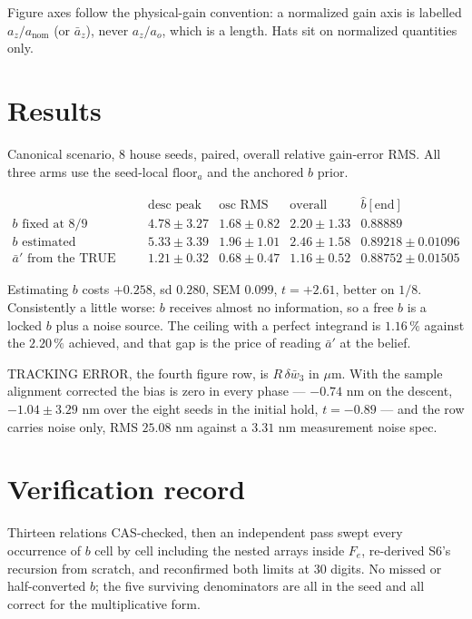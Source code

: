 \documentclass[11pt,a4paper,fontset=none]{ctexart}
\newcommand{\ba}{\bar{a}}
\newcommand{\bw}{\bar{w}}
\begin{document}
Figure axes follow the physical-gain convention: a normalized gain axis is
labelled $a_z/a_{\mathrm{nom}}$ (or $\ba_z$), never $a_z/a_o$, which is a
length. Hats sit on normalized quantities only.

\section*{Results}

Canonical scenario, 8 house seeds, paired, overall relative gain-error RMS. All
three arms use the seed-local $\mathrm{floor}_a$ and the anchored $b$ prior.

\begin{equation*}
\begin{array}{lcccc}
 & \text{desc peak} & \text{osc RMS} & \text{overall} & \hat{b}[\mathrm{end}] \\[0.2em]
b \text{ fixed at } 8/9 & 4.78\pm3.27 & 1.68\pm0.82 & 2.20\pm1.33 & 0.88889 \\
b \text{ estimated}     & 5.33\pm3.39 & 1.96\pm1.01 & 2.46\pm1.58 & 0.89218\pm0.01096 \\
\ba' \text{ from the TRUE height} & 1.21\pm0.32 & 0.68\pm0.47 & 1.16\pm0.52 & 0.88752\pm0.01505
\end{array}
\end{equation*}

Estimating $b$ costs $+0.258$, sd $0.280$, SEM $0.099$, $t = +2.61$, better on
$1/8$. Consistently a little worse: $b$ receives almost no information, so a
free $b$ is a locked $b$ plus a noise source. The ceiling with a perfect
integrand is $1.16\,\%$ against the $2.20\,\%$ achieved, and that gap is the
price of reading $\ba'$ at the belief.

TRACKING ERROR, the fourth figure row, is $R\,\delta\bw_3$ in $\mu$m. With the
sample alignment corrected the bias is zero in every phase --- $-0.74$ nm on the
descent, $-1.04 \pm 3.29$ nm over the eight seeds in the initial hold, $t=-0.89$
--- and the row carries noise only, RMS $25.08$ nm against a $3.31$ nm
measurement noise spec.

\section*{Verification record}

Thirteen relations CAS-checked, then an independent pass swept every occurrence
of $b$ cell by cell including the nested arrays inside $F_e$, re-derived S6's
recursion from scratch, and reconfirmed both limits at 30 digits. No missed or
half-converted $b$; the five surviving denominators are all in the seed and all
correct for the multiplicative form.
\end{document}
